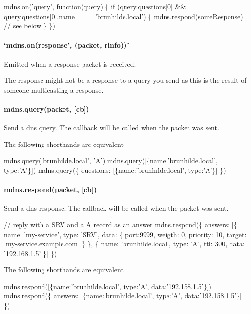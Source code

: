 \begin{DoxyCode}
mdns.on('query', function(query) \{
  if (query.questions[0] && query.questions[0].name === 'brunhilde.local') \{
    mdns.respond(someResponse) // see below
  \}
\})
\end{DoxyCode}


\paragraph*{`mdns.\+on(\textquotesingle{}response', (packet, rinfo))\`{}}

Emitted when a response packet is received.

The response might not be a response to a query you send as this is the result of someone multicasting a response.

\paragraph*{{\ttfamily mdns.\+query(packet, \mbox{[}cb\mbox{]})}}

Send a dns query. The callback will be called when the packet was sent.

The following shorthands are equivalent


\begin{DoxyCode}
mdns.query('brunhilde.local', 'A')
mdns.query([\{name:'brunhilde.local', type:'A'\}])
mdns.query(\{
  questions: [\{name:'brunhilde.local', type:'A'\}]
\})
\end{DoxyCode}


\paragraph*{{\ttfamily mdns.\+respond(packet, \mbox{[}cb\mbox{]})}}

Send a dns response. The callback will be called when the packet was sent.


\begin{DoxyCode}
// reply with a SRV and a A record as an answer
mdns.respond(\{
  answers: [\{
    name: 'my-service',
    type: 'SRV',
    data: \{
      port:9999,
      weigth: 0,
      priority: 10,
      target: 'my-service.example.com'
    \}
  \}, \{
    name: 'brunhilde.local',
    type: 'A',
    ttl: 300,
    data: '192.168.1.5'
  \}]
\})
\end{DoxyCode}


The following shorthands are equivalent


\begin{DoxyCode}
mdns.respond([\{name:'brunhilde.local', type:'A', data:'192.158.1.5'\}])
mdns.respond(\{
  answers: [\{name:'brunhilde.local', type:'A', data:'192.158.1.5'\}]
\})
\end{DoxyCode}


